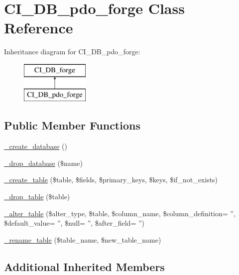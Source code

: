 \hypertarget{class_c_i___d_b__pdo__forge}{\section{C\-I\-\_\-\-D\-B\-\_\-pdo\-\_\-forge Class Reference}
\label{class_c_i___d_b__pdo__forge}
}
Inheritance diagram for C\-I\-\_\-\-D\-B\-\_\-pdo\-\_\-forge\-:\begin{figure}[H]
\begin{center}
\leavevmode
\includegraphics[height=2.000000cm]{class_c_i___d_b__pdo__forge}
\end{center}
\end{figure}
\subsection*{Public Member Functions}
\begin{DoxyCompactItemize}
\item 
\hyperlink{class_c_i___d_b__pdo__forge_a04a053e8e211fd6213a56d990880ce96}{\-\_\-create\-\_\-database} ()
\item 
\hyperlink{class_c_i___d_b__pdo__forge_a6e04d0af5e8e1e1f93f42d63f0744bfd}{\-\_\-drop\-\_\-database} (\$name)
\item 
\hyperlink{class_c_i___d_b__pdo__forge_a99d4c17257f468337344690dd590582b}{\-\_\-create\-\_\-table} (\$table, \$fields, \$primary\-\_\-keys, \$keys, \$if\-\_\-not\-\_\-exists)
\item 
\hyperlink{class_c_i___d_b__pdo__forge_a147efb0d859b7cf4148ff75642515231}{\-\_\-drop\-\_\-table} (\$table)
\item 
\hyperlink{class_c_i___d_b__pdo__forge_a34fc29f48662e18f6a4f3185a8ea206c}{\-\_\-alter\-\_\-table} (\$alter\-\_\-type, \$table, \$column\-\_\-name, \$column\-\_\-definition= '', \$default\-\_\-value= '', \$null= '', \$after\-\_\-field= '')
\item 
\hyperlink{class_c_i___d_b__pdo__forge_aec593ba62c6ff875cafeac16b1c54ae6}{\-\_\-rename\-\_\-table} (\$table\-\_\-name, \$new\-\_\-table\-\_\-name)
\end{DoxyCompactItemize}
\subsection*{Additional Inherited Members}


